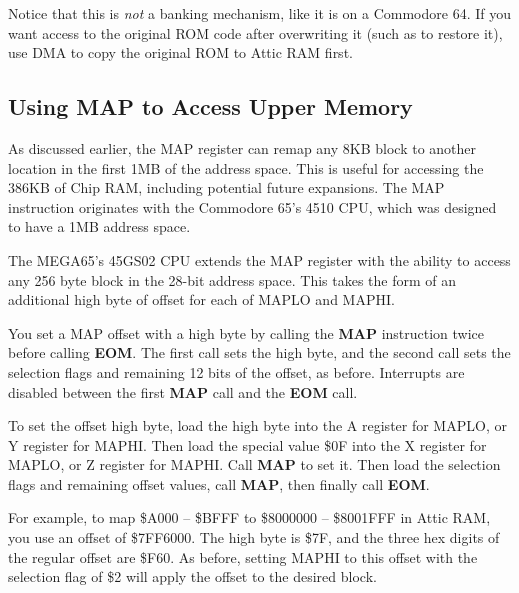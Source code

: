 Notice that this is {\em not} a banking mechanism, like it is on a Commodore
64. If you want access to the original ROM code after overwriting it (such as
to restore it), use DMA to copy the original ROM to Attic RAM first.

\subsection{Using MAP to Access Upper Memory}

As discussed earlier, the MAP register can remap any 8KB block to another
location in the first 1MB of the address space. This is useful for
accessing the 386KB of Chip RAM, including potential future expansions. The MAP
instruction originates with the Commodore 65's 4510 CPU, which was designed to
have a 1MB address space.

The MEGA65's 45GS02 CPU extends the MAP register with the ability to access any
256 byte block in the 28-bit address space. This takes the form of an
additional high byte of offset for each of MAPLO and MAPHI.

You set a MAP offset with a high byte by calling the {\bf MAP} instruction twice
before calling {\bf EOM}. The first call sets the high byte, and the second
call sets the selection flags and remaining 12 bits of the offset, as before.
Interrupts are disabled between the first {\bf MAP} call and the {\bf EOM} call.

To set the offset high byte, load the high byte into the A register for MAPLO,
or Y register for MAPHI. Then load the special value \$0F into the X register
for MAPLO, or Z register for MAPHI. Call {\bf MAP} to set it. Then load the
selection flags and remaining offset values, call {\bf MAP}, then finally call
{\bf EOM}.

For example, to map \$A000 -- \$BFFF to \$8000000 -- \$8001FFF in Attic RAM,
you use an offset of \$7FF6000. The high byte is \$7F, and the three hex digits
of the regular offset are \$F60. As before, setting MAPHI to this offset with
the selection flag of \$2 will apply the offset to the desired block.


